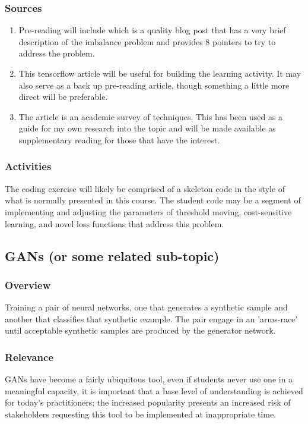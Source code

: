 \documentclass[12pt]{amsart}
\begin{document}
\subsubsection{Sources}
\begin{enumerate}
	\item Pre-reading will include\cite{brownlee2015} which is a quality blog post that has a very brief 
	description of the imbalance problem and provides 8 pointers to try to address the problem.
	\item This \cite{zotero-1472} tensorflow article will be useful for building the learning
	activity. It may also serve as a back up pre-reading article, though something a little 
	more direct will be preferable.
	\item The \cite{johnson2019} article is an academic survey of techniques. 
	This has been used as a guide for my own research into the topic and will be made available
	as supplementary reading for those that have the interest.
\end{enumerate}

\subsubsection{Activities}
The coding exercise will likely be comprised of a skeleton code in the style of what 
is normally presented in this course.
The student code may be a segment of implementing and adjusting the parameters 
of threshold moving, cost-sensitive learning, and novel loss functions that address this problem.



\subsection{GANs (or some related sub-topic)}
\subsubsection{Overview}
Training a pair of neural networks, one that generates a synthetic sample and another that classifies
that synthetic example. The pair engage in an 'arms-race' until acceptable synthetic samples are
produced by the generator network.

\subsubsection{Relevance}
GANs have become a fairly ubiquitous tool, even if students never use one in a meaningful capacity,
it is important that a base level of understanding is achieved for today's practitioners;
the increased popularity presents an increased risk of stakeholders requesting this tool to be
implemented at inappropriate time.
\end{document}
